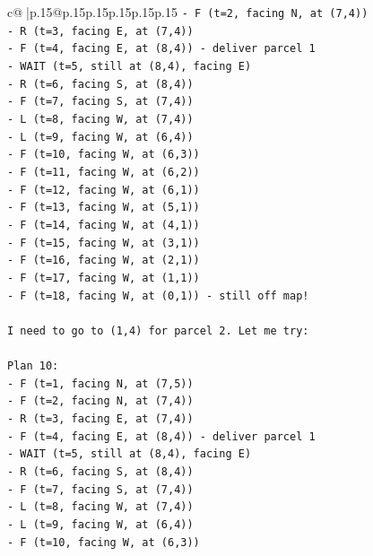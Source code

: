 \documentclass{article}
\begin{document}
{\begin{supertabular}{c@{$\;$}|p{.15\linewidth}@{}p{.15\linewidth}p{.15\linewidth}p{.15\linewidth}p{.15\linewidth}p{.15\linewidth}}
{{{\texttt{{-} F (t=2, facing N, at (7,4))} \\
\texttt{{-} R (t=3, facing E, at (7,4))} \\
\texttt{{-} F (t=4, facing E, at (8,4)) {-} deliver parcel 1} \\
\texttt{{-} WAIT (t=5, still at (8,4), facing E)} \\
\texttt{{-} R (t=6, facing S, at (8,4))} \\
\texttt{{-} F (t=7, facing S, at (7,4))} \\
\texttt{{-} L (t=8, facing W, at (7,4))} \\
\texttt{{-} L (t=9, facing W, at (6,4))} \\
\texttt{{-} F (t=10, facing W, at (6,3))} \\
\texttt{{-} F (t=11, facing W, at (6,2))} \\
\texttt{{-} F (t=12, facing W, at (6,1))} \\
\texttt{{-} F (t=13, facing W, at (5,1))} \\
\texttt{{-} F (t=14, facing W, at (4,1))} \\
\texttt{{-} F (t=15, facing W, at (3,1))} \\
\texttt{{-} F (t=16, facing W, at (2,1))} \\
\texttt{{-} F (t=17, facing W, at (1,1))} \\
\texttt{{-} F (t=18, facing W, at (0,1)) {-} still off map!} \\
\\ 
\texttt{I need to go to (1,4) for parcel 2. Let me try:} \\
\\ 
\texttt{Plan 10:} \\
\texttt{{-} F (t=1, facing N, at (7,5))} \\
\texttt{{-} F (t=2, facing N, at (7,4))} \\
\texttt{{-} R (t=3, facing E, at (7,4))} \\
\texttt{{-} F (t=4, facing E, at (8,4)) {-} deliver parcel 1} \\
\texttt{{-} WAIT (t=5, still at (8,4), facing E)} \\
\texttt{{-} R (t=6, facing S, at (8,4))} \\
\texttt{{-} F (t=7, facing S, at (7,4))} \\
\texttt{{-} L (t=8, facing W, at (7,4))} \\
\texttt{{-} L (t=9, facing W, at (6,4))} \\
\texttt{{-} F (t=10, facing W, at (6,3))} \\
}}}
\end{supertabular}}
\end{document}
